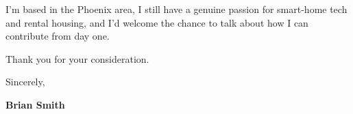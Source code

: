 \documentclass[11pt,letterpaper]{article}
\begin{document}
I'm based in the Phoenix area, I still have a genuine passion for smart-home tech and rental housing, and I'd welcome the chance to talk about how I can contribute from day one.

Thank you for your consideration.

\vspace{4pt}
Sincerely,

\vspace{14pt}
\textbf{Brian Smith}
\end{document}
